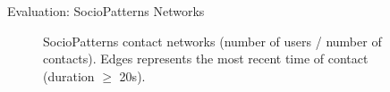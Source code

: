 \documentclass[13pt,aspectratio=169]{beamer}
\begin{document}
\begin{frame}{Evaluation: SocioPatterns Networks}
\begin{figure}
   	\centering
   	 \hfill
	 \hfill
	\caption{SocioPatterns contact networks (number of users / number of contacts). Edges represents the most recent time of contact (duration $\geq$ 20s).}
\end{figure}
\end{frame}
\end{document}
